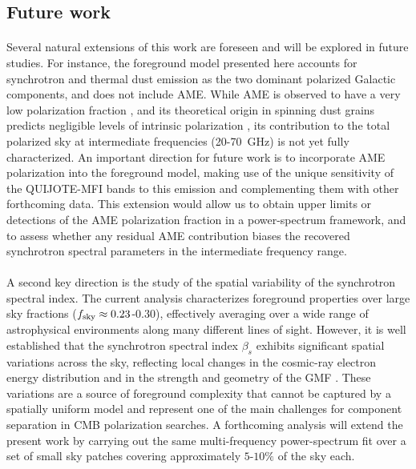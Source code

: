 \subsection{Future work}
\label{sec:future_work}

\paragraph{}

Several natural extensions of this work are foreseen and will be explored in future studies. For instance, the foreground model presented here accounts for synchrotron and thermal dust emission as the two dominant polarized Galactic components, and does not include AME. While AME is observed to have a very low polarization fraction \citep{QUIJOTE_II, QUIJOTE_XVIII}, and its theoretical origin in spinning dust grains predicts negligible levels of intrinsic polarization \citep{AME_polarization, AME_pol_limits}, its contribution to the total polarized sky at intermediate frequencies (20-70~GHz) is not yet fully characterized. An important direction for future work is to incorporate AME polarization into the foreground model, making use of the unique sensitivity of the QUIJOTE-MFI bands to this emission and complementing them with other forthcoming data. This extension would allow us to obtain upper limits or detections of the AME polarization fraction in a power-spectrum framework, and to assess whether any residual AME contribution biases the recovered synchrotron spectral parameters in the intermediate frequency range.

\paragraph{}

A second key direction is the study of the spatial variability of the synchrotron spectral index. The current analysis characterizes foreground properties over large sky fractions ($f_{\rm sky} \approx 0.23$-$0.30$), effectively averaging over a wide range of astrophysical environments along many different lines of sight. However, it is well established that the synchrotron spectral index $\beta_s$ exhibits significant spatial variations across the sky, reflecting local changes in the cosmic-ray electron energy distribution and in the strength and geometry of the GMF \citep{Krachmalnicoff_2018, QUIJOTE_IV}. These variations are a source of foreground complexity that cannot be captured by a spatially uniform model and represent one of the main challenges for component separation in CMB polarization searches. A forthcoming analysis will extend the present work by carrying out the same multi-frequency power-spectrum fit over a set of small sky patches covering approximately $5$-$10\%$ of the sky each. 


